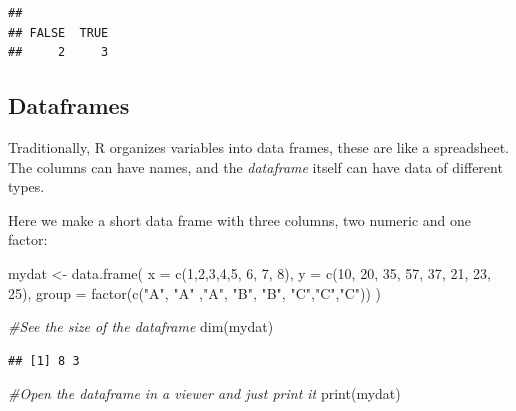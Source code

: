 \documentclass[
]{article}
\newenvironment{Shaded}{\begin{snugshade}}{\end{snugshade}}
\newcommand{\AttributeTok}[1]{\textcolor[rgb]{0.77,0.63,0.00}{#1}}
\newcommand{\CommentTok}[1]{\textcolor[rgb]{0.56,0.35,0.01}{\textit{#1}}}
\newcommand{\DecValTok}[1]{\textcolor[rgb]{0.00,0.00,0.81}{#1}}
\newcommand{\FunctionTok}[1]{\textcolor[rgb]{0.00,0.00,0.00}{#1}}
\newcommand{\NormalTok}[1]{#1}
\newcommand{\OtherTok}[1]{\textcolor[rgb]{0.56,0.35,0.01}{#1}}
\newcommand{\StringTok}[1]{\textcolor[rgb]{0.31,0.60,0.02}{#1}}
\begin{document}
\begin{verbatim}
## 
## FALSE  TRUE 
##     2     3
\end{verbatim}

\hypertarget{dataframes}{%
\subsection{Dataframes}\label{dataframes}}

Traditionally, R organizes variables into data frames, these are like a
spreadsheet. The columns can have names, and the \emph{dataframe} itself can
have data of different types.

Here we make a short data frame with three columns, two numeric and one
factor:

\begin{Shaded}
\begin{Highlighting}[]
\NormalTok{mydat }\OtherTok{\textless{}{-}} \FunctionTok{data.frame}\NormalTok{(}
  \AttributeTok{x =} \FunctionTok{c}\NormalTok{(}\DecValTok{1}\NormalTok{,}\DecValTok{2}\NormalTok{,}\DecValTok{3}\NormalTok{,}\DecValTok{4}\NormalTok{,}\DecValTok{5}\NormalTok{, }\DecValTok{6}\NormalTok{, }\DecValTok{7}\NormalTok{, }\DecValTok{8}\NormalTok{),}
  \AttributeTok{y =} \FunctionTok{c}\NormalTok{(}\DecValTok{10}\NormalTok{, }\DecValTok{20}\NormalTok{, }\DecValTok{35}\NormalTok{, }\DecValTok{57}\NormalTok{, }\DecValTok{37}\NormalTok{, }\DecValTok{21}\NormalTok{, }\DecValTok{23}\NormalTok{, }\DecValTok{25}\NormalTok{),}
  \AttributeTok{group =} \FunctionTok{factor}\NormalTok{(}\FunctionTok{c}\NormalTok{(}\StringTok{"A"}\NormalTok{, }\StringTok{"A"}\NormalTok{ ,}\StringTok{"A"}\NormalTok{, }\StringTok{"B"}\NormalTok{, }\StringTok{"B"}\NormalTok{, }\StringTok{"C"}\NormalTok{,}\StringTok{"C"}\NormalTok{,}\StringTok{"C"}\NormalTok{))}
\NormalTok{)}

\CommentTok{\#See the size of the dataframe}
\FunctionTok{dim}\NormalTok{(mydat)}
\end{Highlighting}
\end{Shaded}

\begin{verbatim}
## [1] 8 3
\end{verbatim}

\begin{Shaded}
\begin{Highlighting}[]
\CommentTok{\#Open the dataframe in a viewer and just print it}
\FunctionTok{print}\NormalTok{(mydat)}
\end{Highlighting}
\end{Shaded}
\end{document}
